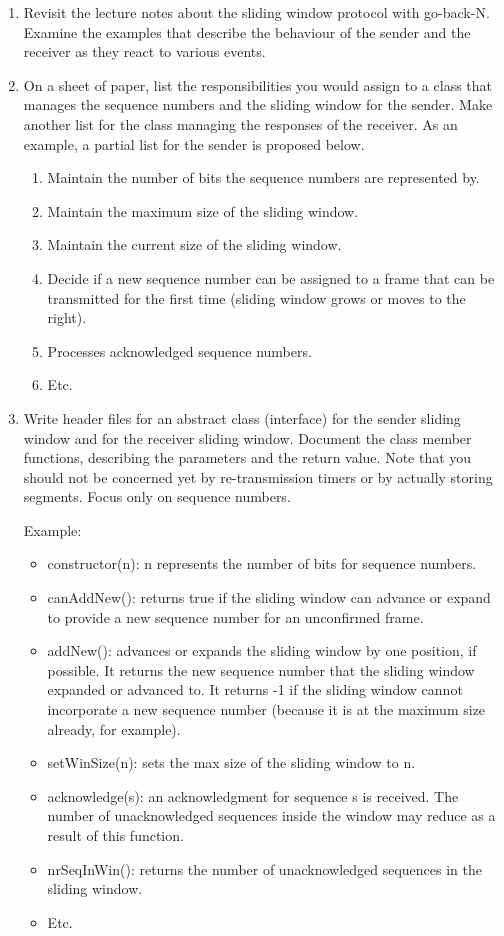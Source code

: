 \documentclass[12pt]{book}
\begin{document}
\begin{enumerate}[label=Activity \arabic*:]
\item Revisit the lecture notes about the sliding window protocol with go-back-N. Examine the examples that describe the behaviour of the sender and the receiver as they react to various events. 

\item On a sheet of paper, list the responsibilities you would assign to a class that manages the sequence numbers and the sliding window for the sender. Make another list for the class managing the responses of the receiver. As an example, a partial list for the sender is proposed below.

  \begin{enumerate}[label=R\arabic*.]
  \item Maintain the number of bits the sequence numbers are represented by.
  \item Maintain the maximum size of the sliding window.
  \item Maintain the current size of the sliding window.
  \item Decide if a new sequence number can be assigned to a frame that can be transmitted for the first time (sliding window grows or moves to the right).
  \item Processes acknowledged sequence numbers.
  \item Etc.
  \end{enumerate}

\item Write header files for an abstract class (interface) for the sender sliding window and for the receiver sliding window. Document the class member functions, describing the parameters and the return value. Note that you should not be concerned yet by re-transmission timers or by actually storing segments. Focus only on sequence numbers.

  Example:
  \begin{itemize}[label=--]
  \item constructor(n): n represents the number of bits for sequence numbers.
  \item canAddNew(): returns true if the sliding window can advance or expand to provide a new sequence number for an unconfirmed frame.
  \item addNew(): advances or expands the sliding window by one position, if possible. It returns the new sequence number that the sliding window expanded or advanced to. It returns -1 if the sliding window cannot incorporate a new sequence number (because it is at the maximum size already, for example).
  \item setWinSize(n): sets the max size of the sliding window to n.
  \item acknowledge(s): an acknowledgment for sequence s is received. The number of unacknowledged sequences inside the window may reduce as a result of this function.
  \item nrSeqInWin(): returns the number of unacknowledged sequences in the sliding window.
  \item Etc.
  \end{itemize}
\end{enumerate}
\end{document}
